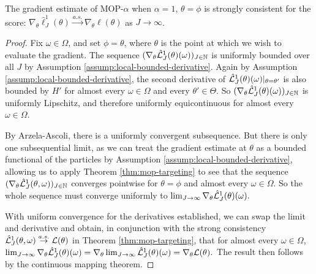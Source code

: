 \documentclass[11pt]{article}
\begin{document}
\begin{thm}
    The gradient estimate of MOP-$\alpha$ when $\alpha=1$, $\theta=\phi$ is strongly consistent for the score: $\nabla_\theta \hat\ell_J^1(\theta) \stackrel{a.s.}{\to} \nabla_\theta \ell(\theta)$ as $J \to \infty$.
    \label{thm:mop-grad-consistency}
\end{thm}
\begin{proof}
    Fix $\omega \in \Omega$, and set $\phi = \theta$, where $\theta$ is the point at which we wish to evaluate the gradient. The sequence $(\nabla_\theta \hat{\mathcal{L}}_J^1(\theta)(\omega))_{J \in \mathbb{N}}$ is uniformly bounded over all $J$ by Assumption \ref{assump:local-bounded-derivative}. Again by Assumption \ref{assump:local-bounded-derivative}, the second derivative of $\hat{\mathcal{L}}_J^1(\theta)(\omega)|_{\theta=\theta'}$ is also bounded by $H'$ for almost every $\omega\in \Omega$ and every $\theta'\in \Theta$. So $(\nabla_\theta \hat{\mathcal{L}}_J^1(\theta)( \omega))_{J \in \mathbb{N}}$ is uniformly Lipschitz, and therefore uniformly equicontinuous for almost every $\omega \in \Omega$.

    By Arzela-Ascoli, there is a uniformly convergent subsequence. But there is only one subsequential limit, as we can treat the gradient estimate at $\theta$ as a bounded functional of the particles by Assumption \ref{assump:local-bounded-derivative}, allowing us to apply Theorem \ref{thm:mop-targeting} to see that the sequence $(\nabla_\theta \hat{\mathcal{L}}_J^1(\theta, \omega))_{J \in \mathbb{N}}$ converges pointwise for $\theta=\phi$ and almost every $\omega \in \Omega$. So the whole sequence must converge uniformly to $\lim_{J \to \infty} \nabla_\theta \hat{\mathcal{L}}_J^1(\theta)(\omega).$ 
    
    With uniform convergence for the derivatives established, we can swap the limit and derivative and obtain, in conjunction with the strong consistency $\hat{\mathcal{L}}_J^1(\theta, \omega) \stackrel{a.s.}{\to} \mathcal{L}(\theta)$ in Theorem \ref{thm:mop-targeting}, that for almost every $\omega \in \Omega$, 
    $\lim_{J \to \infty} \nabla_\theta \hat{\mathcal{L}}_J^1(\theta)(\omega) = \nabla_\theta \lim_{J \to \infty} \hat{\mathcal{L}}_J^1(\theta)(\omega) = \nabla_\theta \mathcal{L}(\theta).$
    The result then follows by the continuous mapping theorem. 
\end{proof}
\end{document}
